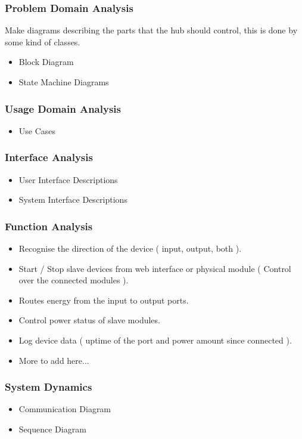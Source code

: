 	\subsubsection{Problem Domain Analysis}
			Make diagrams describing the parts that the hub should control, this is done by some kind of classes.
		\begin{itemize}
			\item Block Diagram\\
			\item State Machine Diagrams
		\end{itemize}
	\subsubsection{Usage Domain Analysis}
		\begin{itemize}
			\item Use Cases
		\end{itemize}
	\subsubsection{Interface Analysis}
		\begin{itemize}
			\item User Interface Descriptions
			\item System Interface Descriptions
		\end{itemize}
	\subsubsection{Function Analysis}
		\begin{itemize}
			\item Recognise the direction of the device ( input, output, both ).
			\item Start / Stop slave devices from web interface or physical module ( Control over the connected modules ).
			\item Routes energy from the input to output ports.
			\item Control power status of slave modules.
			\item Log device data ( uptime of the port and power amount since connected ).
			\item More to add here...
		\end{itemize}
	\subsubsection{System Dynamics}
		\begin{itemize}
			\item Communication Diagram
			\item Sequence Diagram
		\end{itemize}
